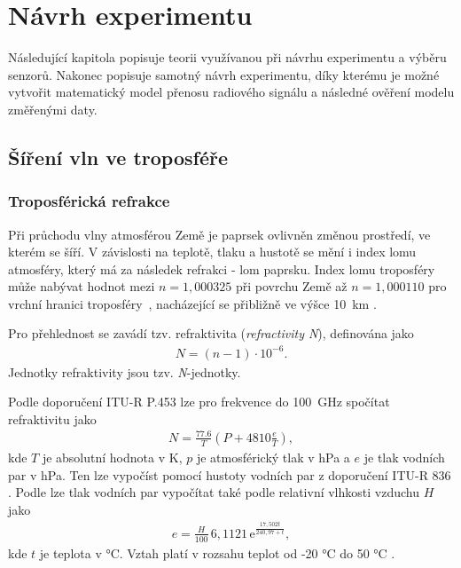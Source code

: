 \documentclass[twoside]{ctuthesis}
\newcommand{\mt}[1]{\text{#1}}
\theoremstyle{plain}
\theoremstyle{definition}
\theoremstyle{note}
\begin{document}
	




























	

\chapter{Návrh experimentu}
	Následující kapitola popisuje teorii využívanou při návrhu experimentu a výběru senzorů. Nakonec popisuje samotný návrh experimentu, díky kterému je možné vytvořit matematický model přenosu radiového signálu a následné ověření modelu změřenými daty. 
	\section{Šíření vln ve troposféře}
		\subsection{Troposférická refrakce}
		Při průchodu vlny atmosférou Země je paprsek ovlivněn změnou prostředí, ve kterém se šíří. V závislosti na teplotě, tlaku a hustotě se mění i index lomu atmosféry, který má za následek refrakci - lom paprsku. Index lomu troposféry může nabývat hodnot mezi $n=1{,}000325$ při povrchu Země až $n=1{,}000110$ pro vrchní hranici troposféry~\cite{zaklady:sireni:vln}, nacházející se přibližně ve výšce 10~km \cite{web_tropo}.

		Pro přehlednost se zavádí tzv. refraktivita (\textit{refractivity N}), definována jako
		\begin{align}
			N = (n-1)\cdot 10^{-6}.
		\end{align}
		Jednotky refraktivity jsou tzv. \textit{N}-jednotky.

		Podle doporučení ITU-R P.453 \cite{ITU:refrac} lze pro frekvence do 100~GHz spočítat refraktivitu jako
		\begin{align}
			N = \frac{77.6}{T} \left(P + 4810\frac{e}{T}\right),
			\label{eq:tropo:refrac}
		\end{align}
		kde $T$ je absolutní hodnota v K, $p$ je atmosférický tlak v hPa a $e$ je tlak vodních par v hPa. Ten lze vypočíst pomocí hustoty vodních par z doporučení ITU-R 836 \cite{ITU:vapour}. Podle \cite{ITU:refrac} lze tlak vodních par vypočítat také podle relativní vlhkosti vzduchu $H$ jako
		\begin{align}
			e = \frac{H}{100}\,6{,}1121\,\mt{e}^{\frac{17{,}502t}{240{,}97 + t}},
			\label{eq:tropo:e}
		\end{align}
		kde $t$ je teplota v °C. Vztah platí v rozsahu teplot od -20 °C do 50 °C \cite{zaklady:sireni:vln}.
\end{document}
